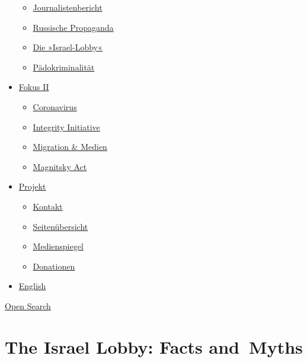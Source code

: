 \begin{itemize}
  \begin{itemize}
  \tightlist
  \item
    \href{https://swprs.org/bericht-eines-journalisten/}{Journalistenbericht}
  \item
    \href{https://swprs.org/russische-propaganda/}{Russische Propaganda}
  \item
    \href{https://swprs.org/die-israel-lobby-fakten-und-mythen/}{Die
    »Israel-Lobby«}
  \item
    \href{https://swprs.org/geopolitik-und-paedokriminalitaet/}{Pädokriminalität}
  \end{itemize}
\item
  \href{https://swprs.org/migration-und-medien/}{Fokus II}

  \begin{itemize}
  \tightlist
  \item
    \href{https://swprs.org/covid-19-hinweis-ii/}{Coronavirus}
  \item
    \href{https://swprs.org/die-integrity-initiative/}{Integrity
    Initiative}
  \item
    \href{https://swprs.org/migration-und-medien/}{Migration \& Medien}
  \item
    \href{https://swprs.org/der-fall-magnitsky/}{Magnitsky Act}
  \end{itemize}
\item
  \href{https://swprs.org/kontakt/}{Projekt}

  \begin{itemize}
  \tightlist
  \item
    \href{https://swprs.org/kontakt/}{Kontakt}
  \item
    \href{https://swprs.org/uebersicht/}{Seitenübersicht}
  \item
    \href{https://swprs.org/medienspiegel/}{Medienspiegel}
  \item
    \href{https://swprs.org/donationen/}{Donationen}
  \end{itemize}
\item
  \href{https://swprs.org/contact/}{English}
\end{itemize}

\protect\hyperlink{}{Open Search}

\hypertarget{the-israel-lobby-facts-and-myths}{%
\section{The Israel Lobby: Facts
and~Myths}\label{the-israel-lobby-facts-and-myths}}


